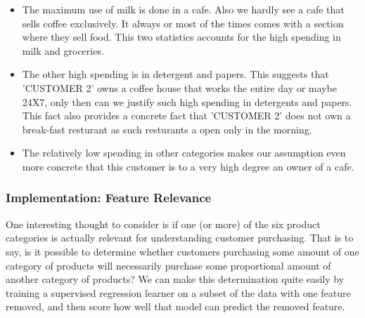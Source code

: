 \documentclass[11pt]{article}
\providecommand{\tightlist}{%
      \setlength{\itemsep}{0pt}\setlength{\parskip}{0pt}}
\begin{document}
\begin{itemize}
\begin{itemize}
    \begin{itemize}
    \tightlist
    \item
      The maximum use of milk is done in a cafe. Also we hardly see a
      cafe that sells coffee exclusively. It always or most of the times
      comes with a section where they sell food. This two statistics
      accounts for the high spending in milk and groceries.
    \item
      The other high spending is in detergent and papers. This suggests
      that 'CUSTOMER 2' owns a coffee house that works the entire day or
      maybe 24X7, only then can we justify such high spending in
      detergents and papers. This fact also provides a concrete fact
      that 'CUSTOMER 2' does not own a break-fast resturant as such
      resturants a open only in the morning.
    \item
      The relatively low spending in other categories makes our
      assumption even more concrete that this customer is to a very high
      degree an owner of a cafe.
    \end{itemize}
  \end{itemize}
\end{itemize}

    \subsubsection{Implementation: Feature
Relevance}\label{implementation-feature-relevance}

One interesting thought to consider is if one (or more) of the six
product categories is actually relevant for understanding customer
purchasing. That is to say, is it possible to determine whether
customers purchasing some amount of one category of products will
necessarily purchase some proportional amount of another category of
products? We can make this determination quite easily by training a
supervised regression learner on a subset of the data with one feature
removed, and then score how well that model can predict the removed
feature.
\end{document}
